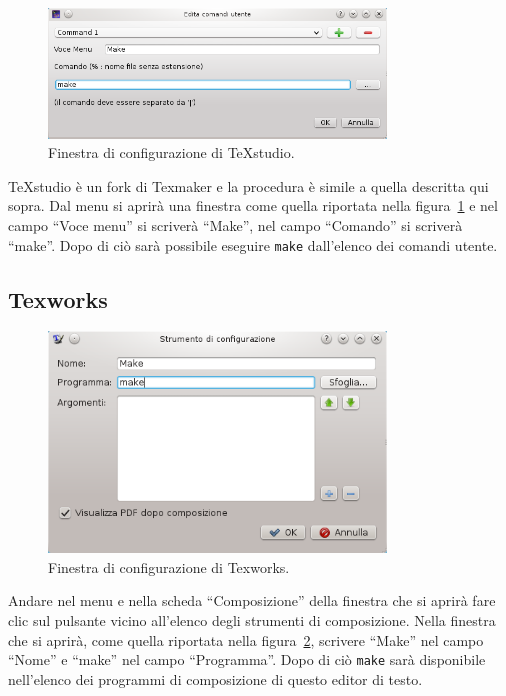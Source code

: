 \begin{figure}
  \centering
  \includegraphics[width=0.8\textwidth]{figure/texstudio}  
  \caption{Finestra di configurazione di TeXstudio.}
  \label{fig:texstudio}
\end{figure}
TeXstudio è un fork di Texmaker e la procedura è simile a quella descritta qui
sopra.  Dal menu  si aprirà
una finestra come quella riportata nella figura~\ref{fig:texstudio} e nel campo
``Voce menu'' si scriverà ``Make'', nel campo ``Comando'' si scriverà ``make''.
Dopo di ciò sarà possibile eseguire \texttt{make} dall'elenco dei comandi
utente.

\subsection{Texworks}
\label{sec:texworks}

\begin{figure}
  \centering
  \includegraphics[width=0.8\textwidth]{figure/texworks}
  \caption{Finestra di configurazione di Texworks.}
  \label{fig:texworks}
\end{figure}
Andare nel menu  e nella scheda ``Composizione''
della finestra che si aprirà fare clic sul pulsante \keys{{+}} vicino all'elenco
degli strumenti di composizione.  Nella finestra che si aprirà, come quella
riportata nella figura~\ref{fig:texworks}, scrivere ``Make'' nel campo ``Nome''
e ``make'' nel campo ``Programma''.  Dopo di ciò \texttt{make} sarà disponibile
nell'elenco dei programmi di composizione di questo editor di testo.

